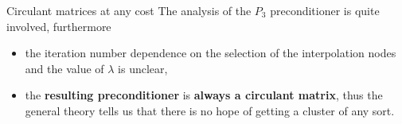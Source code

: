 \documentclass[aspectratio=169,xcolor=dvipsnames]{beamer}
\begin{document}
\begin{frame}{Circulant matrices at any cost}
The analysis of the \textcolor{amber}{\faMeh}\;$P_3$ preconditioner is quite involved, furthermore
\begin{itemize}
	\item[\faCogs] the iteration number dependence on the selection of the interpolation nodes and the value of $\lambda$ is unclear,
	\item[\faCogs] the \textbf{resulting preconditioner} is \textbf{always a circulant matrix}, thus the general theory tells us that there is \alert{no hope of} getting \alert{a cluster} of any sort.
\end{itemize}



\end{frame}
\end{document}
